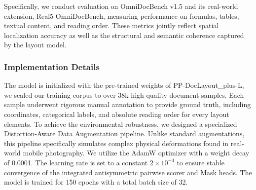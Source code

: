 \documentclass[11pt, a4paper,logo,  copyright, nonumbering]{paddleocr}
\begin{document}
Specifically, we conduct evaluation on OmniDocBench v1.5 and its real-world extension, Real5-OmniDocBench, measuring performance on formulas, tables, textual content, and reading order. These metrics jointly reflect spatial localization accuracy as well as the structural and semantic coherence captured by the layout model.


\subsubsection{Implementation Details}
\label{subsubsec:implementation_details}

The model is initialized with the pre-trained weights of PP-DocLayout\_plus-L, we scaled our training corpus to over 38k high-quality document samples. Each sample underwent rigorous manual annotation to provide ground truth, including coordinates, categorical labels, and absolute reading order for every layout elements. To achieve the environmental robustness, we designed a specialized Distortion-Aware Data Augmentation pipeline. Unlike standard augmentations, this pipeline specifically simulates complex physical deformations found in real-world mobile photography. We utilize the AdamW optimizer with a weight decay of 0.0001. The learning rate is set to a constant \(2 \times 10^{-4}\) to ensure stable convergence of the integrated antisymmetric pairwise scorer and Mask heads. The model is trained for 150 epochs with a total batch size of 32.
\end{document}
